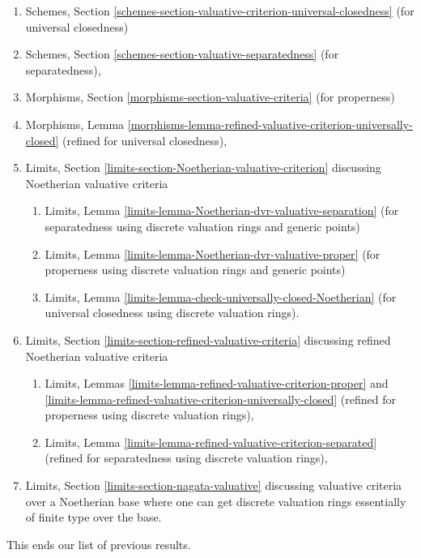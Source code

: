 \begin{enumerate}
\item Schemes, Section
\ref{schemes-section-valuative-criterion-universal-closedness}
(for universal closedness)
\item Schemes, Section \ref{schemes-section-valuative-separatedness}
(for separatedness),
\item Morphisms, Section \ref{morphisms-section-valuative-criteria}
(for properness)
\item Morphisms, Lemma
\ref{morphisms-lemma-refined-valuative-criterion-universally-closed}
(refined for universal closedness),
\item Limits, Section \ref{limits-section-Noetherian-valuative-criterion}
discussing Noetherian valuative criteria
\begin{enumerate}
\item Limits, Lemma \ref{limits-lemma-Noetherian-dvr-valuative-separation}
(for separatedness using discrete valuation rings and generic points)
\item Limits, Lemma \ref{limits-lemma-Noetherian-dvr-valuative-proper}
(for properness using discrete valuation rings and generic points)
\item Limits, Lemma \ref{limits-lemma-check-universally-closed-Noetherian}
(for universal closedness using discrete valuation rings).
\end{enumerate}
\item Limits, Section \ref{limits-section-refined-valuative-criteria}
discussing refined Noetherian valuative criteria
\begin{enumerate}
\item Limits, Lemmas
\ref{limits-lemma-refined-valuative-criterion-proper} and
\ref{limits-lemma-refined-valuative-criterion-universally-closed}
(refined for properness using discrete valuation rings),
\item Limits, Lemma \ref{limits-lemma-refined-valuative-criterion-separated}
(refined for separatedness using discrete valuation rings),
\end{enumerate}
\item Limits, Section \ref{limits-section-nagata-valuative}
discussing valuative criteria over a Noetherian base where
one can get discrete valuation rings essentially of finite type
over the base.
\end{enumerate}
This ends our list of previous results.

